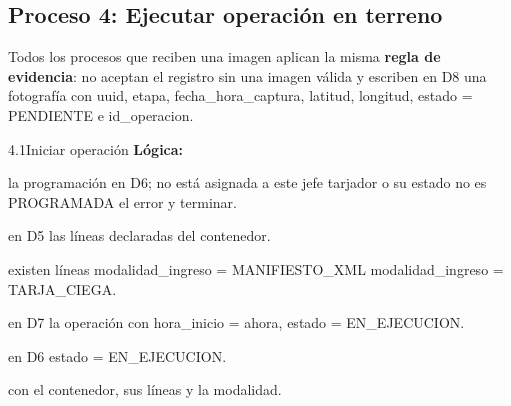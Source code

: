 \subsection{Proceso 4: Ejecutar operación en terreno}

Todos los procesos que reciben una imagen aplican la misma \textbf{regla de evidencia}: no
aceptan el registro sin una imagen válida y escriben en D8 una fotografía con uuid,
etapa, fecha\_hora\_captura, latitud, longitud, estado = PENDIENTE e id\_operacion.

\begin{minispec}{4.1}{Iniciar operación}
\textbf{Lógica:}
\begin{logica}
    \item {} la programación en D6;  no está asignada a este jefe tarjador o su
    estado no es PROGRAMADA  el error y terminar.
    \item {} en D5 las líneas declaradas del contenedor.
    \item {} existen líneas  modalidad\_ingreso = MANIFIESTO\_XML 
    modalidad\_ingreso = TARJA\_CIEGA.
    \item {} en D7 la operación con hora\_inicio = ahora, estado = EN\_EJECUCION.
    \item {} en D6 estado = EN\_EJECUCION.
    \item {}  con el contenedor, sus líneas y la
    modalidad.
\end{logica}
\end{minispec}


